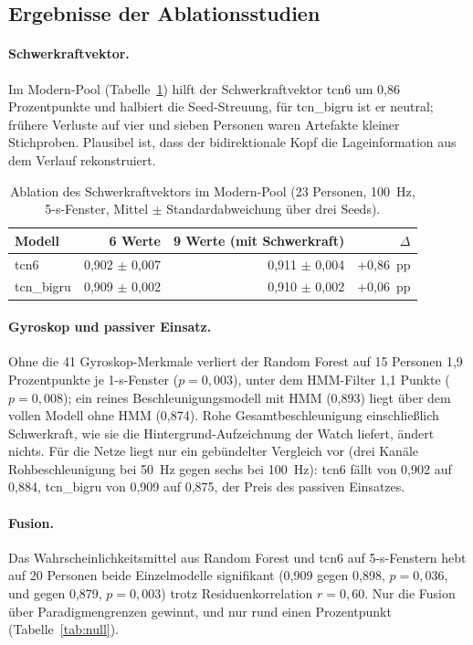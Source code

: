 \subsection{Ergebnisse der Ablationsstudien}
\label{sec:ablation-results}

\paragraph{Schwerkraftvektor.} Im Modern-Pool (Tabelle~\ref{tab:gravity})
hilft der Schwerkraftvektor tcn6 um 0,86 Prozentpunkte und halbiert die
Seed-Streuung, für tcn\_bigru ist er neutral; frühere Verluste auf vier und
sieben Personen waren Artefakte kleiner Stichproben. Plausibel ist, dass der
bidirektionale Kopf die Lageinformation aus dem Verlauf rekonstruiert.

\begin{table}[H]
  \centering
  \caption{Ablation des Schwerkraftvektors im Modern-Pool (23 Personen,
  100~Hz, 5-s-Fenster, Mittel $\pm$ Standardabweichung über drei Seeds).}
  \label{tab:gravity}
  \begin{tabular}{lrrr}
    \hline
    \textbf{Modell} & \textbf{6 Werte} & \textbf{9 Werte (mit Schwerkraft)} & $\Delta$ \\ \hline \hline
    tcn6 & 0,902 $\pm$ 0,007 & 0,911 $\pm$ 0,004 & +0,86~pp \\
    tcn\_bigru & 0,909 $\pm$ 0,002 & 0,910 $\pm$ 0,002 & +0,06~pp \\ \hline
  \end{tabular}
\end{table}

\paragraph{Gyroskop und passiver Einsatz.} Ohne die 41 Gyroskop-Merkmale
verliert der Random Forest auf 15 Personen 1,9 Prozentpunkte je 1-s-Fenster
($p = 0{,}003$), unter dem HMM-Filter 1,1 Punkte ($p = 0{,}008$); ein
reines Beschleunigungsmodell mit HMM (0,893) liegt über dem vollen Modell
ohne HMM (0,874). Rohe Gesamtbeschleunigung einschließlich Schwerkraft, wie
sie die Hintergrund-Aufzeichnung der Watch liefert, ändert nichts. Für die
Netze liegt nur ein gebündelter Vergleich vor (drei Kanäle Rohbeschleunigung
bei 50~Hz gegen sechs bei 100~Hz): tcn6 fällt von 0,902 auf 0,884,
tcn\_bigru von 0,909 auf 0,875, der Preis des passiven Einsatzes.

\paragraph{Fusion.} Das Wahrscheinlichkeitsmittel aus Random Forest und tcn6
auf 5-s-Fenstern hebt auf 20 Personen beide Einzelmodelle signifikant
(0,909 gegen 0,898, $p = 0{,}036$, und gegen 0,879, $p = 0{,}003$) trotz
Residuenkorrelation $r = 0{,}60$. Nur die Fusion über Paradigmengrenzen
gewinnt, und nur rund einen Prozentpunkt (Tabelle~\ref{tab:null}).


